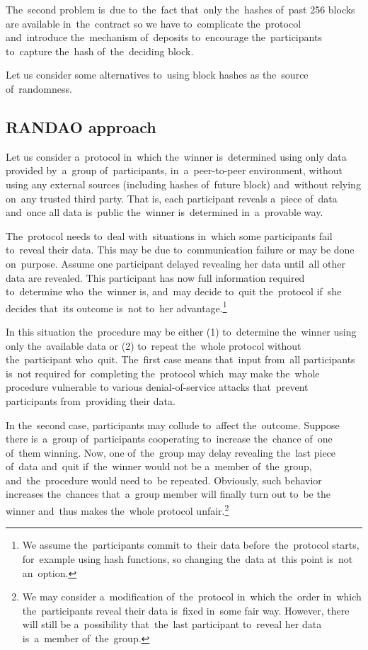 \documentclass[a4paper]{article}
\begin{document}
    The~second problem is~due to~the~fact that~only the~hashes of~past 256 blocks are available in~the~contract
    so we have to~complicate the~protocol and~introduce the~mechanism of~deposits to~encourage the~participants
    to~capture the~hash of~the~deciding block.

    Let us consider some alternatives to~using block hashes as the~source of~randomness.

    \subsection{RANDAO approach}
    Let us consider a~protocol in~which the~winner is~determined using only data provided by~a~group of~participants,
    in~a~peer-to-peer environment, without using any external sources (including hashes of~future block) and~without
    relying on~any trusted third party. That is, each participant reveals a~piece of~data and~once all data is~public
    the~winner is~determined in~a~provable way.

    The~protocol needs to~deal with~situations in~which some participants fail to~reveal their data. This may be due
    to~communication failure or may be done on~purpose. Assume one participant delayed revealing her data until~all
    other data are revealed. This participant has now full information required to~determine who~the~winner is,
    and~may decide to~quit the~protocol if~she decides that~its outcome is~not to~her advantage.\footnote{We assume
    the~participants commit to~their data before~the~protocol starts, for~example using hash functions,
    so changing the~data at~this point is~not an~option.}

    In this situation the~procedure may be either (1) to~determine the~winner using only the~available data or (2)
    to~repeat the~whole protocol without the~participant who~quit. The~first case means that~input from~all
    participants is~not required for~completing the~protocol which~may make the~whole procedure vulnerable to
    various denial-of-service attacks that~prevent participants from~providing their data.

    In the~second case, participants may collude to~affect the~outcome. Suppose there is~a~group of~participants
    cooperating to~increase the~chance of~one of~them winning. Now, one of~the~group may delay revealing the~last
    piece of~data and~quit if~the~winner would not be a~member of~the~group, and~the~procedure would need to~be
    repeated. Obviously, such behavior increases the~chances that~a~group member will finally turn out to~be the
    winner and~thus makes the~whole protocol unfair.\footnote{We may consider a~modification of~the~protocol in~which
    the~order in~which the~participants reveal their data is~fixed in~some fair way. However, there will still be
    a~possibility that~the~last participant to~reveal her data is~a~member of~the~group.}
\end{document}

